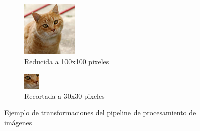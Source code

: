 \documentclass[11pt]{article}
\begin{document}
\begin{figure}
    \begin{subfigure}[b]{0.3\textwidth}
        \centering
        \includegraphics[width=\textwidth]{resources/distributed_systems/pipeline_images/scaled.png}
        \caption{Reducida a 100x100 pixeles}
    \end{subfigure}
    \hspace{10mm}
    \begin{subfigure}[b]{0.3\textwidth}
        \centering
        \includegraphics[width=\textwidth]{resources/distributed_systems/pipeline_images/cropped.png}
        \caption{Recortada a 30x30 pixeles}
    \end{subfigure}
    \caption{Ejemplo de transformaciones del pipeline de procesamiento de imágenes}
    \label{fig:sis_dist:ip_example}
\end{figure}
\end{document}

